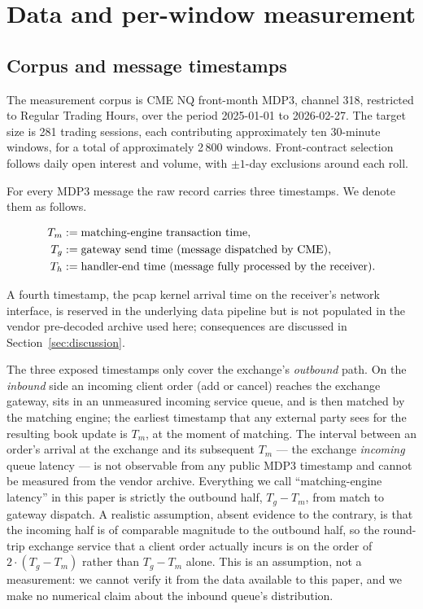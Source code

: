 \documentclass[11pt]{article}
\begin{document}
\section{Data and per-window measurement}
\label{sec:data}

\subsection{Corpus and message timestamps}
\label{sec:corpus}

The measurement corpus is CME NQ front-month MDP3, channel 318, restricted to Regular Trading Hours, over the period 2025-01-01 to 2026-02-27. The target size is 281 trading sessions, each contributing approximately ten 30-minute windows, for a total of approximately 2\,800 windows. Front-contract selection follows daily open interest and volume, with $\pm 1$-day exclusions around each roll.

For every MDP3 message the raw record carries three timestamps. We denote them as follows.

\begin{align}
\label{eq:timestamps}
T_m &:= \text{matching-engine transaction time}, \notag \\
T_g &:= \text{gateway send time (message dispatched by CME)}, \notag \\
T_h &:= \text{handler-end time (message fully processed by the receiver)}.
\end{align}

A fourth timestamp, the pcap kernel arrival time on the receiver's network interface, is reserved in the underlying data pipeline but is not populated in the vendor pre-decoded archive used here; consequences are discussed in Section~\ref{sec:discussion}.

The three exposed timestamps only cover the exchange's \emph{outbound} path. On the \emph{inbound} side an incoming client order (add or cancel) reaches the exchange gateway, sits in an unmeasured incoming service queue, and is then matched by the matching engine; the earliest timestamp that any external party sees for the resulting book update is $T_m$, at the moment of matching. The interval between an order's arrival at the exchange and its subsequent $T_m$ --- the exchange \emph{incoming} queue latency --- is not observable from any public MDP3 timestamp and cannot be measured from the vendor archive. Everything we call ``matching-engine latency'' in this paper is strictly the outbound half, $T_g - T_m$, from match to gateway dispatch. A realistic assumption, absent evidence to the contrary, is that the incoming half is of comparable magnitude to the outbound half, so the round-trip exchange service that a client order actually incurs is on the order of $2 \cdot (T_g - T_m)$ rather than $T_g - T_m$ alone. This is an assumption, not a measurement: we cannot verify it from the data available to this paper, and we make no numerical claim about the inbound queue's distribution.
\end{document}
